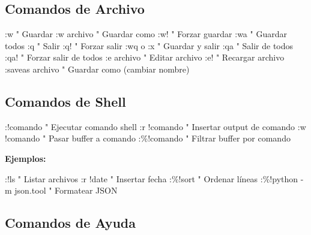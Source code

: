 \documentclass[
  doc,
  floatsintext,
  longtable,
  a4paper,
  nolmodern,
  notxfonts,
  notimes,
  12pt,
  colorlinks=true,linkcolor=blue,citecolor=blue,urlcolor=blue]{apa7}
\newenvironment{Shaded}{\begin{snugshade}}{\end{snugshade}}
\newcommand{\NormalTok}[1]{\textcolor[rgb]{0.00,0.23,0.31}{#1}}
\begin{document}
\subsection{Comandos de Archivo}\label{comandos-de-archivo}

\begin{Shaded}
\begin{Highlighting}[]
\NormalTok{:w              " Guardar}
\NormalTok{:w archivo      " Guardar como}
\NormalTok{:w!             " Forzar guardar}
\NormalTok{:wa             " Guardar todos}
\NormalTok{:q              " Salir}
\NormalTok{:q!             " Forzar salir}
\NormalTok{:wq o :x        " Guardar y salir}
\NormalTok{:qa             " Salir de todos}
\NormalTok{:qa!            " Forzar salir de todos}
\NormalTok{:e archivo      " Editar archivo}
\NormalTok{:e!             " Recargar archivo}
\NormalTok{:saveas archivo " Guardar como (cambiar nombre)}
\end{Highlighting}
\end{Shaded}

\subsection{Comandos de Shell}\label{comandos-de-shell}

\begin{Shaded}
\begin{Highlighting}[]
\NormalTok{:!comando       " Ejecutar comando shell}
\NormalTok{:r !comando     " Insertar output de comando}
\NormalTok{:w !comando     " Pasar buffer a comando}
\NormalTok{:\%!comando      " Filtrar buffer por comando}
\end{Highlighting}
\end{Shaded}

\textbf{Ejemplos:}

\begin{Shaded}
\begin{Highlighting}[]
\NormalTok{:!ls            " Listar archivos}
\NormalTok{:r !date        " Insertar fecha}
\NormalTok{:\%!sort         " Ordenar líneas}
\NormalTok{:\%!python {-}m json.tool  " Formatear JSON}
\end{Highlighting}
\end{Shaded}

\subsection{Comandos de Ayuda}\label{comandos-de-ayuda}
\end{document}
